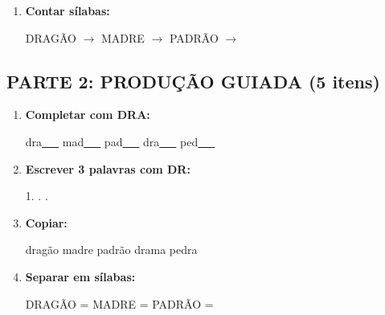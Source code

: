 \begin{exercicio}
\begin{enumerate}
  \item \textbf{Contar sílabas:}
  \begin{center}
  DRAGÃO $\rightarrow$ \underline{\hspace{0.9cm}} \quad MADRE $\rightarrow$ \underline{\hspace{0.9cm}} \quad PADRÃO $\rightarrow$ \underline{\hspace{0.9cm}}
  \end{center}

\end{enumerate}

\subsection*{PARTE 2: PRODUÇÃO GUIADA (5 itens)}

\begin{enumerate}[resume]

  \item \textbf{Completar com DRA:}
  \begin{center}
  dra\underline{~~~} \quad mad\underline{~~~} \quad pad\underline{~~~} \quad dra\underline{~~~} \quad ped\underline{~~~}
  \end{center}

  \item \textbf{Escrever 3 palavras com DR:}
  \begin{center}
  1. \underline{\hspace{3cm}} . \underline{\hspace{3cm}} . \underline{\hspace{3cm}}
  \end{center}

  \item \textbf{Copiar:}
  \begin{center}
  dragão \quad madre \quad padrão \quad drama \quad pedra
  \end{center}

  \item \textbf{Separar em sílabas:}
  \begin{center}
  DRAGÃO = \underline{\hspace{1cm}} \underline{\hspace{1cm}} \quad MADRE = \underline{\hspace{1cm}} \underline{\hspace{1cm}} \quad PADRÃO = \underline{\hspace{1cm}} \underline{\hspace{1cm}}
  \end{center}


\end{enumerate}
\end{exercicio}
